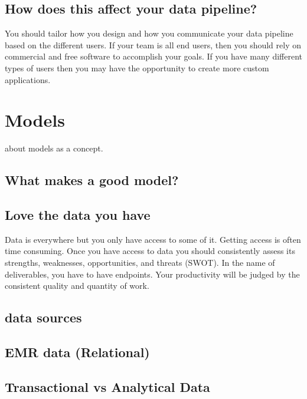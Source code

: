 \documentclass[
]{book}
\begin{document}
\section{How does this affect your data pipeline?}\label{how-does-this-affect-your-data-pipeline}

You should tailor how you design and how you communicate your data pipeline based on the different users. If your team is all end users, then you should rely on commercial and free software to accomplish your goals. If you have many different types of users then you may have the opportunity to create more custom applications.

\chapter{Models}\label{models}

about models as a concept.

\section{What makes a good model?}\label{what-makes-a-good-model}

\section{Love the data you have}\label{love-the-data-you-have}

Data is everywhere but you only have access to some of it. Getting access is often time consuming. Once you have access to data you should consistently assess its strengths, weaknesses, opportunities, and threats (SWOT). In the name of deliverables, you have to have endpoints. Your productivity will be judged by the consistent quality and quantity of work.

\section{data sources}\label{data-sources}

\section{EMR data (Relational)}\label{emr-data-relational}

\section{Transactional vs Analytical Data}\label{transactional-vs-analytical-data}
\end{document}
